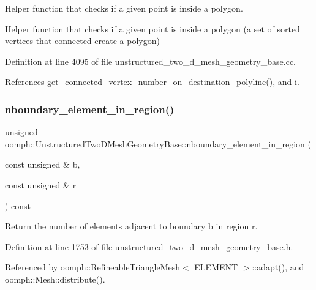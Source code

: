 Helper function that checks if a given point is inside a polygon. 

Helper function that checks if a given point is inside a polygon (a set of sorted vertices that connected create a polygon) 

Definition at line 4095 of file unstructured\+\_\+two\+\_\+d\+\_\+mesh\+\_\+geometry\+\_\+base.\+cc.



References get\+\_\+connected\+\_\+vertex\+\_\+number\+\_\+on\+\_\+destination\+\_\+polyline(), and i.

\mbox{\label{classoomph_1_1UnstructuredTwoDMeshGeometryBase_a93eb7cb31573833c66dc0eaa4ae357ef}} 
\subsubsection{\texorpdfstring{nboundary\+\_\+element\+\_\+in\+\_\+region()}{nboundary\_element\_in\_region()}}
{\footnotesize\ttfamily unsigned oomph\+::\+Unstructured\+Two\+D\+Mesh\+Geometry\+Base\+::nboundary\+\_\+element\+\_\+in\+\_\+region (\begin{DoxyParamCaption}\item[{const unsigned \&}]{b,  }\item[{const unsigned \&}]{r }\end{DoxyParamCaption}) const\hspace{0.3cm}{\ttfamily [inline]}}



Return the number of elements adjacent to boundary b in region r. 



Definition at line 1753 of file unstructured\+\_\+two\+\_\+d\+\_\+mesh\+\_\+geometry\+\_\+base.\+h.



Referenced by oomph\+::\+Refineable\+Triangle\+Mesh$<$ E\+L\+E\+M\+E\+N\+T $>$\+::adapt(), and oomph\+::\+Mesh\+::distribute().

\mbox{\label{classoomph_1_1UnstructuredTwoDMeshGeometryBase_a5408ad4ce30e3c987c32dab46cdffba2}} 
